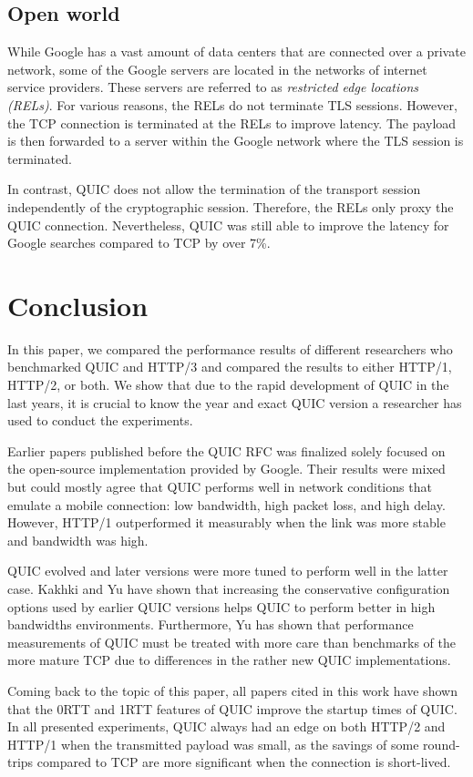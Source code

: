 \documentclass[conference]{IEEEtran}
\begin{document}
\subsection{Open world}

While Google has a vast amount of data centers that are connected over a private network, some of the Google servers are located in the networks of internet service providers. These servers are referred to as \textit{restricted edge locations (RELs)}. For various reasons, the RELs do not terminate TLS sessions. However, the TCP connection is terminated at the RELs to improve latency. The payload is then forwarded to a server within the Google network where the TLS session is terminated. \cite{Google}

In contrast, QUIC does not allow the termination of the transport session independently of the cryptographic session. Therefore, the RELs only proxy the QUIC connection. Nevertheless, QUIC was still able to improve the latency for Google searches compared to TCP by over 7\%. 

\section{Conclusion}

In this paper, we compared the performance results of different researchers who benchmarked QUIC and HTTP/3 and compared the results to either HTTP/1, HTTP/2, or both. We show that due to the rapid development of QUIC in the last years, it is crucial to know the year and exact QUIC version a researcher has used to conduct the experiments.

Earlier papers published before the QUIC RFC was finalized solely focused on the open-source implementation provided by Google. Their results were mixed but could mostly agree that QUIC performs well in network conditions that emulate a mobile connection: low bandwidth, high packet loss, and high delay. However, HTTP/1 outperformed it measurably when the link was more stable and bandwidth was high.

QUIC evolved and later versions were more tuned to perform well in the latter case. Kakhki \cite{Kakhki} and Yu \cite{Yu2} have shown that increasing the conservative configuration options used by earlier QUIC versions helps QUIC to perform better in high bandwidths environments. Furthermore, Yu has shown that performance measurements of QUIC must be treated with more care than benchmarks of the more mature TCP due to differences in the rather new QUIC implementations. 

Coming back to the topic of this paper, all papers cited in this work have shown that the 0RTT and 1RTT features of QUIC improve the startup times of QUIC. In all presented experiments, QUIC always had an edge on both HTTP/2 and HTTP/1 when the transmitted payload was small, as the savings of some round-trips compared to TCP are more significant when the connection is short-lived.



\end{document}
